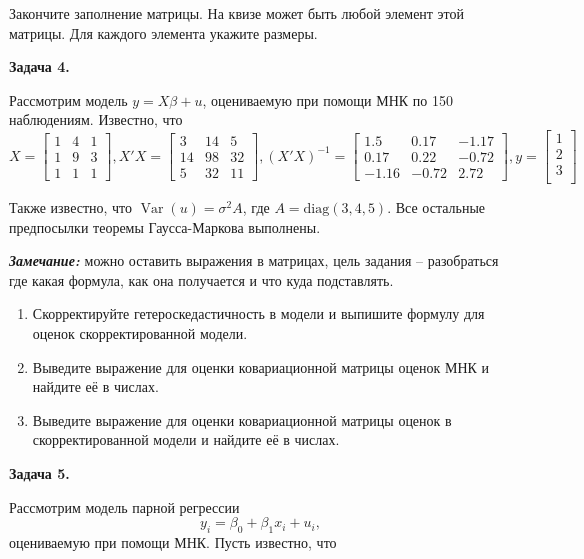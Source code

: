 \documentclass[10pt, a4paper]{extarticle}
\DeclareMathOperator{\Var}{Var}
\begin{document}
	Закончите заполнение матрицы. На квизе может быть любой элемент этой матрицы. Для каждого элемента укажите размеры.
	\vspace{1em}
	
	{\Large \textbf{Задача 4.}}
	
	Рассмотрим модель $y = X\beta + u$, оцениваемую при помощи МНК по 150 наблюдениям. Известно, что
	\[
	X = \begin{bmatrix}
	1 & 4 & 1 \\
	1 & 9 & 3 \\
	1 & 1 & 1
	\end{bmatrix},
	X'X = \begin{bmatrix}
		3 & 14 & 5 \\
		14 & 98 & 32 \\
		5 & 32 & 11
	\end{bmatrix},
	(X'X)^{-1} = \begin{bmatrix}
		1.5 & 0.17 & -1.17 \\
		0.17 & 0.22 & -0.72 \\
		-1.16 & -0.72 & 2.72
	\end{bmatrix},
	y = \begin{bmatrix}
		1 \\
		2 \\
		3 \\
	\end{bmatrix}
	\]
	
	Также известно, что $\Var(u) = \sigma^2A$, где $A = \mathrm{diag}(3, 4, 5)$. Все остальные предпосылки теоремы Гаусса-Маркова выполнены.
	
	\textit{\textbf{Замечание:}} можно оставить выражения в матрицах, цель задания -- разобраться где какая формула, как она получается и что куда подставлять.
	
	\begin{enumerate}[label = \alph*)]
		\item Скорректируйте гетероскедастичность в модели и выпишите формулу для оценок скорректированной модели.
		\item Выведите выражение для оценки ковариационной матрицы оценок МНК и найдите её в числах.
		\item Выведите выражение для оценки ковариационной матрицы оценок в скорректированной модели и найдите её в числах.
	\end{enumerate}
	\vspace{1em}

	{\Large \textbf{Задача 5.}}
	
	Рассмотрим модель парной регрессии
	\[
	y_i = \beta_0 + \beta_1x_i + u_i,
	\]
	оцениваемую при помощи МНК. Пусть известно, что 
	
\end{document}

